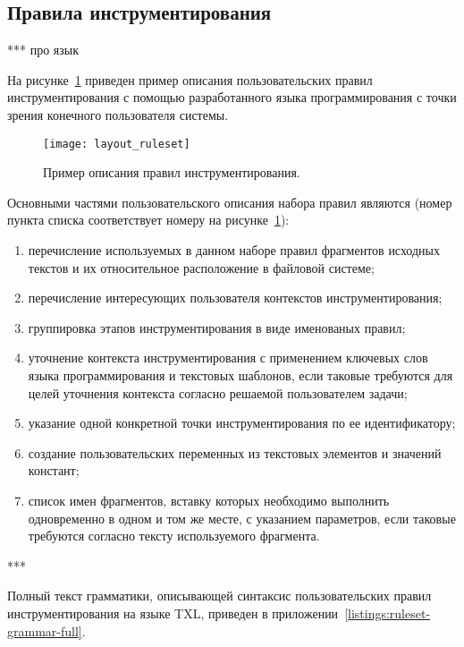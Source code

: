\subsection{Правила инструментирования}

***
про язык

На рисунке~\ref{fig:layout-ruleset} приведен пример описания пользовательских правил инструментирования с помощью разработанного языка программирования с точки зрения конечного пользователя системы.

\begin{figure}[!h]
  \centering
  \texttt{[image: layout\_ruleset]}
  \caption{Пример описания правил инструментирования.}
  \label{fig:layout-ruleset}
\end{figure}

Основными частями пользовательского описания набора правил являются (номер пункта списка соответствует номеру на рисунке~\ref{fig:layout-ruleset}):
\begin{enumerate}[noitemsep]
  \item перечисление используемых в данном наборе правил фрагментов исходных текстов и их относительное расположение в файловой системе;
  \item перечисление интересующих пользователя контекстов инструментирования;
  \item группировка этапов инструментирования в виде именованых правил;
  \item уточнение контекста инструментирования с применением ключевых слов языка программирования и текстовых шаблонов, если таковые требуются для целей уточнения контекста согласно решаемой пользователем задачи;
  \item указание одной конкретной точки инструментирования по ее идентификатору;
  \item создание пользовательских переменных из текстовых элементов и значений констант;
  \item список имен фрагментов, вставку которых необходимо выполнить одновременно в одном и том же месте, с указанием параметров, если таковые требуются согласно тексту используемого фрагмента.
\end{enumerate}

***

Полный текст грамматики, описывающей синтаксис пользовательских правил инструментирования на языке TXL, приведен в приложении~\ref{listings:ruleset-grammar-full}.

